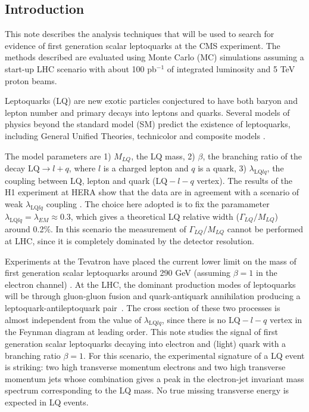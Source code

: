 \documentclass{cmspaper}
\begin{document}
\begin{linenumbers}
\section{Introduction}
 
This note describes the analysis techniques that will be used to search for evidence of first generation scalar leptoquarks 
at the CMS experiment. The methods described are evaluated using Monte Carlo (MC) simulations assuming a start-up LHC scenario
with about 100 pb$^{-1}$ of integrated luminosity and 5 TeV proton beams.

Leptoquarks (LQ) are new exotic particles conjectured to have both baryon and lepton number and primary decays into leptons and quarks.    
Several models of physics beyond the standard model (SM) predict the existence of leptoquarks, including General Unified Theories, 
technicolor and composite models \cite{theories}.  

The model parameters are 1) $M_{LQ}$, the LQ mass, 2) $\beta$, the branching ratio of the decay 
$\mbox{LQ} \rightarrow l + q$, where $l$ is a charged lepton and $q$ is a quark, 
3) $\lambda_{\mbox{LQ}lq}$, the coupling between LQ, lepton and quark ($\mbox{LQ}-l-q$ vertex). 
The results of the H1 experiment at HERA show that the data are in agreement with a scenario of weak 
$\lambda_{\mbox{LQ}lq}$ coupling \cite{hera}. The choice here adopted
is to fix the paramameter $\lambda_{\mbox{LQ}lq} = \lambda_{EM} \approx 0.3$, which gives 
a theoretical LQ relative width ($\Gamma_{LQ}/M_{LQ}$) around 0.2\%. 
In this scenario the measurement of $\Gamma_{LQ}/M_{LQ}$ cannot be performed at LHC, since it is completely dominated by the detector resolution.  

Experiments at the Tevatron have placed the current lower limit on the mass of first generation scalar 
leptoquarks around 290 GeV (assuming $\beta=1$ in the electron channel) \cite{d02008}.
At the LHC, the dominant production modes of leptoquarks will be through gluon-gluon fusion and 
quark-antiquark annihilation producing a leptoquark-antileptoquark pair~\cite{Kramer}. 
The cross section of these two processes is almost independent from the value of 
$\lambda_{\mbox{LQ}lq}$, since there is no $\mbox{LQ}-l-q$ vertex in the Feynman diagram 
at leading order. This note studies the signal of first generation scalar leptoquarks decaying into electron and 
(light) quark with a branching ratio $\beta=1$. 
For this scenario, the experimental signature of a LQ event is striking: two 
high transverse momentum electrons and two high transverse momentum jets 
whose combination gives a peak in the electron-jet invariant mass 
spectrum corresponding to the LQ mass. No true missing transverse energy is expected in LQ events.


\end{linenumbers}
\end{document}
